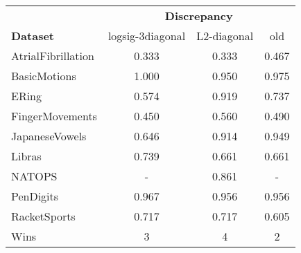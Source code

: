 \begin{tabular}{lccc}
\toprule
& \multicolumn{3}{c}{\textbf{Discrepancy}} \\
\textbf{Dataset} &  logsig-3diagonal &  L2-diagonal &   old \\
\midrule
AtrialFibrillation &             0.333 &        0.333 & 0.467 \\
BasicMotions       &             1.000 &        0.950 & 0.975 \\
ERing              &             0.574 &        0.919 & 0.737 \\
FingerMovements    &             0.450 &        0.560 & 0.490 \\
JapaneseVowels     &             0.646 &        0.914 & 0.949 \\
Libras             &             0.739 &        0.661 & 0.661 \\
NATOPS             &                 - &        0.861 &     - \\
PenDigits          &             0.967 &        0.956 & 0.956 \\
RacketSports       &             0.717 &        0.717 & 0.605 \\ 
\midrule
Wins &                 3 &            4 &    2 \\
\bottomrule
\end{tabular}
